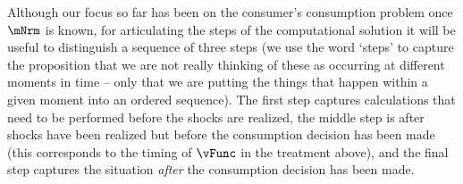   Although our focus so far has been on the consumer's consumption problem once $\mNrm$ is known, for articulating the steps of the computational solution it will be useful to distinguish a sequence of three steps (we use the word `steps' to capture the proposition that we are not really thinking of these as occurring at different moments in time -- only that we are putting the things that happen within a given moment into an ordered sequence).  The first step captures calculations that need to be performed before the shocks are realized, the middle step is after shocks have been realized but before the consumption decision has been made (this corresponds to the timing of $\vFunc$ in the treatment above), and the final step captures the situation \textit{after} the consumption decision has been made.
